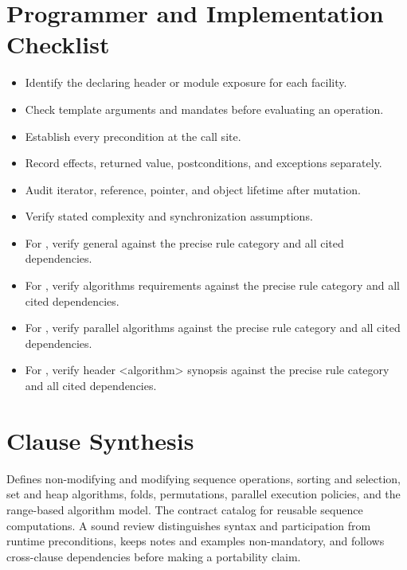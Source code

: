\documentclass[11pt,letterpaper]{article}
\begin{document}
\section{Programmer and Implementation Checklist}
\begin{CornellReferenceChecklistBox}\begin{itemize}[label=$\square$]
\item Identify the declaring header or module exposure for each facility.
\item Check template arguments and mandates before evaluating an operation.
\item Establish every precondition at the call site.
\item Record effects, returned value, postconditions, and exceptions separately.
\item Audit iterator, reference, pointer, and object lifetime after mutation.
\item Verify stated complexity and synchronization assumptions.
\item For , verify general against the precise rule category and all cited dependencies.
\item For , verify algorithms requirements against the precise rule category and all cited dependencies.
\item For , verify parallel algorithms against the precise rule category and all cited dependencies.
\item For , verify header <algorithm> synopsis against the precise rule category and all cited dependencies.
\end{itemize}\end{CornellReferenceChecklistBox}
\section{Clause Synthesis}
\begin{CornellReferenceOrientationBox}Defines non-modifying and modifying sequence operations, sorting and selection, set and heap algorithms, folds, permutations, parallel execution policies, and the range-based algorithm model. The contract catalog for reusable sequence computations. A sound review distinguishes syntax and participation from runtime preconditions, keeps notes and examples non-mandatory, and follows cross-clause dependencies before making a portability claim.\end{CornellReferenceOrientationBox}
\end{document}
